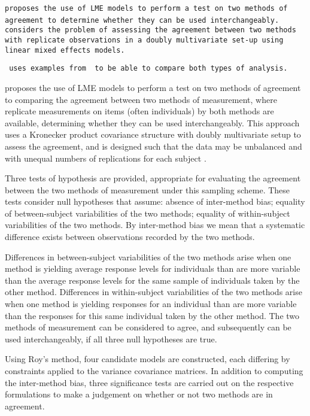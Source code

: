 \documentclass[12pt, a4paper]{report}
\theoremstyle{plain}
\theoremstyle{definition}
\theoremstyle{remark}
\begin{document}
	\texttt{\citet{ARoy2009}proposes the use of LME models to perform a test
		on two methods of agreement to determine whether they can be used
		interchangeably.	}
	\texttt{ \citet{ARoy2009} considers the problem of assessing the agreement
		between two methods with replicate observations in a doubly
		multivariate set-up using linear mixed effects models.}
	
	
	\texttt{\citet{ARoy2009} uses examples from \citet{BA86} to be able to
		compare both types of analysis.}
	

	
	
	\newpage
	
	
	\citet{ARoy2009} proposes the use of LME models to perform a test on two methods of agreement to comparing the agreement between two methods of measurement, where replicate measurements on items (often individuals) by both methods are available, determining whether they can be used
	interchangeably. This approach uses a Kronecker product covariance structure with doubly multivariate setup to
	assess the agreement, and is designed such that the data may be unbalanced and with unequal numbers of replications for each subject \citep{ARoy2009}.
	
	Three tests of hypothesis are provided, appropriate for evaluating the agreement between the two methods of measurement under this sampling scheme. These tests consider null hypotheses that assume: absence of inter-method bias; equality of between-subject variabilities of the two methods; equality of within-subject variabilities of the two methods. By inter-method bias we mean that a systematic difference exists between observations recorded by the two methods. 
	
	Differences in between-subject variabilities of the two methods arise when one method is yielding average response levels for individuals than are more variable than the average response levels for the same sample of individuals taken by the other method.  Differences in within-subject variabilities of the two methods arise when one method is yielding responses for an individual than are more variable than the responses for this same individual taken by the other method. The two methods of measurement can be considered to agree, and subsequently can be used interchangeably, if all three null hypotheses are true.	
	
	\bigskip
	Using Roy's method, four candidate models are constructed, each differing by constraints applied to the variance covariance matrices. In addition to computing the inter-method bias, three significance tests are carried out on the respective formulations to make a judgement on whether or not two methods are in agreement.
	\bigskip
	
\end{document}

